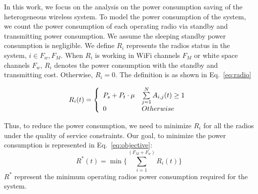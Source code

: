 In this work, we focus on the analysis on the power consumption saving of the heterogeneous wireless system. 
To model the power consumption of the system, we count the power consumption of each operating radio via 
standby and transmitting power consumption.
We assume the sleeping standby power consumption is negligible. 
We define $R_i$ represents the radios status in the system, $i\in {F_w,F_M}$. 
When $R_i$ is working in WiFi channels $F_M$ or white space channels $F_w$, $R_i$ denotes the power consumption 
with the standby and transmitting cost. 
Otherwise, $R_i = 0$. The definition is as shown in Eq.~\ref{eq:radio}

\begin{equation}
\label{eq:radio}
 R_i(t) = \left\{ 
	  \begin{array}{l l}
	    P_s+P_t\cdot\mu   &  \sum\limits_{j=1}^N A_{i,j}(t) \ge 1\\
		0 &  Otherwise
			    \end{array} \right.
\end{equation}

Thus, to reduce the power consumption, we need to minimize $R_i$ for all the radios under the quality of service 
constraints. 
Our goal, to minimize the power consumption is represented in Eq.~\ref{eq:objective}:
\begin{equation}
\label{eq:objective}
R^*(t) = \min{\{\sum\limits_{i=1}^{(F_M+F_w)} R_{i}}(t)\}
\end{equation}
$R^*$ represent the minimum operating radios power consumption required for the system. 

